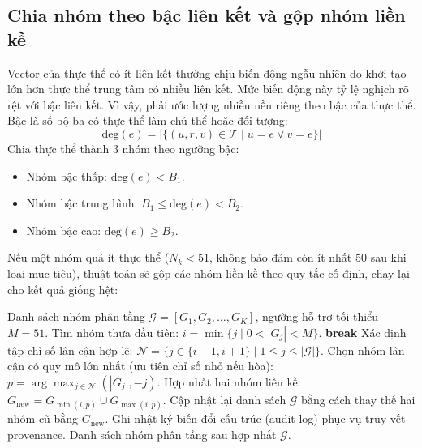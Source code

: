 \subsection{Chia nhóm theo bậc liên kết và gộp nhóm liền kề}
Vector của thực thể có ít liên kết thường chịu biến động ngẫu nhiên do khởi tạo lớn hơn thực thể trung tâm có nhiều liên kết. Mức biến động này tỷ lệ nghịch rõ rệt với bậc liên kết. Vì vậy, phải ước lượng nhiễu nền riêng theo bậc của thực thể. Bậc là số bộ ba có thực thể làm chủ thể hoặc đối tượng:
\begin{equation}
\text{deg}(e) = \left| \{ (u, r, v) \in \mathcal{T} \mid u = e \lor v = e \} \right|
\end{equation}
Chia thực thể thành 3 nhóm theo ngưỡng bậc:
\begin{itemize}
    \item Nhóm bậc thấp: $\text{deg}(e) < B_1$.
    \item Nhóm bậc trung bình: $B_1 \le \text{deg}(e) < B_2$.
    \item Nhóm bậc cao: $\text{deg}(e) \ge B_2$.
\end{itemize}

Nếu một nhóm quá ít thực thể ($N_k < 51$, không bảo đảm còn ít nhất 50 sau khi loại mục tiêu), thuật toán sẽ gộp các nhóm liền kề theo quy tắc cố định, chạy lại cho kết quả giống hệt:

\begin{algorithm}[H]
\caption{Gộp nhóm bậc liền kề khi một nhóm có quá ít thực thể}
\label{alg:bucket_merging}
\begin{algorithmic}[1]
\Require Danh sách nhóm phân tầng $\mathcal{G} = [G_1, G_2, \dots, G_K]$, ngưỡng hỗ trợ tối thiểu $M=51$.
    \State Tìm nhóm thưa đầu tiên: $i = \min \{j \mid 0 < |G_j| < M\}$.
     \State \textbf{break} \EndIf
    \State Xác định tập chỉ số lân cận hợp lệ: $\mathcal{N} = \{j \in \{i-1, i+1\} \mid 1 \le j \le |\mathcal{G}|\}$.
    \State Chọn nhóm lân cận có quy mô lớn nhất (ưu tiên chỉ số nhỏ nếu hòa):
    \State $p = \arg\max_{j \in \mathcal{N}} (|G_j|, -j)$.
    \State Hợp nhất hai nhóm liền kề: $G_{\text{new}} = G_{\min(i, p)} \cup G_{\max(i, p)}$.
    \State Cập nhật lại danh sách $\mathcal{G}$ bằng cách thay thế hai nhóm cũ bằng $G_{\text{new}}$.
    \State Ghi nhật ký biến đổi cấu trúc (audit log) phục vụ truy vết provenance.
\EndWhile
\State \Return Danh sách nhóm phân tầng sau hợp nhất $\mathcal{G}$.
\end{algorithmic}
\end{algorithm}

